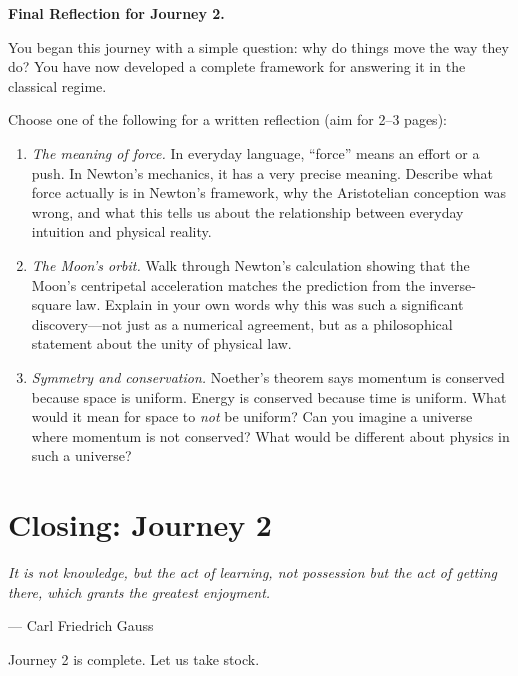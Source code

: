 \documentclass[12pt, a4paper, twoside]{book}
\theoremstyle{disc}
\begin{document}
\begin{reflectionbox}
\textbf{Final Reflection for Journey 2.}

You began this journey with a simple question: why do things move the way they do? You have now developed a complete framework for answering it in the classical regime.

Choose one of the following for a written reflection (aim for 2--3 pages):

\begin{enumerate}[leftmargin=2em, itemsep=4pt]
  \item \textit{The meaning of force.} In everyday language, ``force'' means an effort or a push. In Newton's mechanics, it has a very precise meaning. Describe what force actually is in Newton's framework, why the Aristotelian conception was wrong, and what this tells us about the relationship between everyday intuition and physical reality.

  \item \textit{The Moon's orbit.} Walk through Newton's calculation showing that the Moon's centripetal acceleration matches the prediction from the inverse-square law. Explain in your own words why this was such a significant discovery---not just as a numerical agreement, but as a philosophical statement about the unity of physical law.

  \item \textit{Symmetry and conservation.} Noether's theorem says momentum is conserved because space is uniform. Energy is conserved because time is uniform. What would it mean for space to \textit{not} be uniform? Can you imagine a universe where momentum is not conserved? What would be different about physics in such a universe?
\end{enumerate}
\end{reflectionbox}

\chapter*{Closing: Journey 2}

\epigraph{
  \itshape It is not knowledge, but the act of learning, not possession but the act of getting there, which grants the greatest enjoyment.
}{--- Carl Friedrich Gauss}

Journey 2 is complete. Let us take stock.
\end{document}

